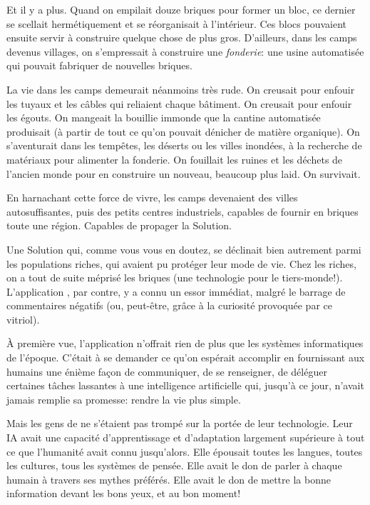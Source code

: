 Et il y a plus. Quand on empilait douze briques pour former un bloc, ce
dernier se scellait hermétiquement et se réorganisait à l'intérieur. Ces
blocs pouvaient ensuite servir à construire quelque chose de plus gros.
D'ailleurs, dans les camps devenus villages, on
s'empressait à construire une \textit{fonderie}: une usine automatisée qui
pouvait fabriquer de nouvelles briques.

La vie dans les camps demeurait néanmoins très rude. On creusait pour
enfouir les tuyaux et les câbles qui reliaient chaque bâtiment. On creusait
pour enfouir les égouts.  On mangeait la bouillie immonde que la cantine
automatisée produisait (à partir de tout ce qu'on pouvait dénicher de
matière organique).  On s'aven\-turait dans les tempêtes, les déserts ou
les villes inondées, à la recherche de matériaux pour alimenter la
fonderie.  On fouillait les ruines et les déchets de l'ancien monde pour en
construire un nouveau, beaucoup plus laid.
On survivait.

En harnachant cette force de vivre, les camps devenaient
des villes autosuffisantes, puis des petits centres industriels, capables
de fournir en briques toute une région. Capables de propager la
Solution.

Une Solution qui, comme vous vous en doutez, se déclinait bien autrement
parmi les populations riches, qui avaient pu protéger leur
mode de vie.  Chez les riches, on a tout de suite méprisé les briques (une
technologie pour le tiers-monde!). L'application \nomProjet{}, par contre,
y a connu un essor immédiat, malgré le barrage de commentaires négatifs (ou,
peut-être, grâce à la curiosité provoquée par ce vitriol).

À première vue, l'application n'offrait rien de plus que
les systèmes informatiques de l'époque. C'était à se demander ce
qu'on espérait accomplir en fournis\-sant aux humains une énième façon de
communiquer, de se renseigner, de déléguer certaines tâches lassantes à une
intelligence artificielle qui, jusqu'à ce jour, n'avait jamais remplie sa
promesse: rendre la vie plus simple.

Mais les gens de \nomProjet{} ne s'étaient pas trompé sur la portée de leur
technologie. Leur IA avait une capacité d'apprentissage et d'adapt\-ation
largement supérieure à tout ce que l'humanité avait connu jusqu'alors. Elle
épousait toutes les langues, toutes les cultures, tous les systèmes de pensée.
Elle avait le don de parler à chaque humain à travers ses mythes préférés.
Elle avait le don de mettre la bonne information devant les bons yeux, et au
bon moment! 

